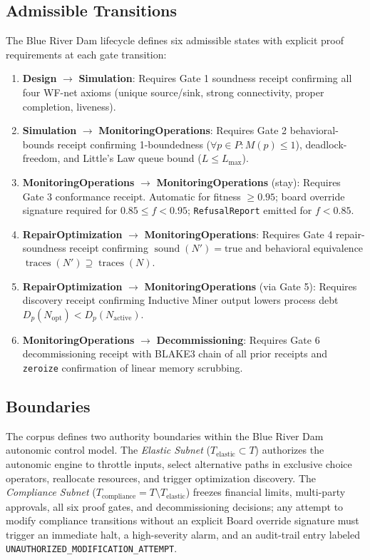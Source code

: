 \subsection{Admissible Transitions}
\label{sec:prompts-architecture-transitions}

The Blue River Dam lifecycle defines six admissible states with explicit proof
requirements at each gate transition:

\begin{enumerate}
  \item \textbf{Design} $\to$ \textbf{Simulation}: Requires Gate 1 soundness receipt
    confirming all four WF-net axioms (unique source/sink, strong connectivity,
    proper completion, liveness).
  \item \textbf{Simulation} $\to$ \textbf{MonitoringOperations}: Requires Gate 2
    behavioral-bounds receipt confirming 1-boundedness ($\forall p \in P: M(p) \leq 1$),
    deadlock-freedom, and Little's Law queue bound ($L \leq L_{\max}$).
  \item \textbf{MonitoringOperations} $\to$ \textbf{MonitoringOperations} (stay):
    Requires Gate 3 conformance receipt. Automatic for fitness $\geq 0.95$; board
    override signature required for $0.85 \leq f < 0.95$; \texttt{RefusalReport}
    emitted for $f < 0.85$.
  \item \textbf{RepairOptimization} $\to$ \textbf{MonitoringOperations}: Requires
    Gate 4 repair-soundness receipt confirming $\operatorname{sound}(N') = \text{true}$
    and behavioral equivalence $\operatorname{traces}(N') \supseteq \operatorname{traces}(N)$.
  \item \textbf{RepairOptimization} $\to$ \textbf{MonitoringOperations} (via Gate 5):
    Requires discovery receipt confirming Inductive Miner output lowers process debt
    $D_p(N_\text{opt}) < D_p(N_\text{active})$.
  \item \textbf{MonitoringOperations} $\to$ \textbf{Decommissioning}: Requires Gate 6
    decommissioning receipt with BLAKE3 chain of all prior receipts and \texttt{zeroize}
    confirmation of linear memory scrubbing.
\end{enumerate}

\subsection{Boundaries}
\label{sec:prompts-architecture-boundaries}

The corpus defines two authority boundaries within the Blue River Dam autonomic
control model. The \emph{Elastic Subnet} ($T_\text{elastic} \subset T$) authorizes
the autonomic engine to throttle inputs, select alternative paths in exclusive choice
operators, reallocate resources, and trigger optimization discovery. The
\emph{Compliance Subnet} ($T_\text{compliance} = T \setminus T_\text{elastic}$)
freezes financial limits, multi-party approvals, all six proof gates, and
decommissioning decisions; any attempt to modify compliance transitions without an
explicit Board override signature must trigger an immediate halt, a high-severity
alarm, and an audit-trail entry labeled \texttt{UNAUTHORIZED\_MODIFICATION\_ATTEMPT}.

